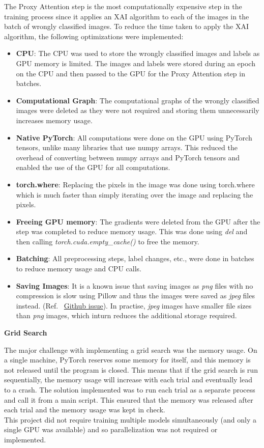 \documentclass[a4paper,11pt,openright]{book}
\begin{document}
The Proxy Attention step is the most computationally expensive step in the training process since it applies an XAI algorithm to each of the images in the batch of wrongly classified images. To reduce the time taken to apply the XAI algorithm, the following optimizations were implemented:
\begin{itemize}
    \item \textbf{CPU}: The CPU was used to store the wrongly classified images and labels as GPU memory is limited. The images and labels were stored during an epoch on the CPU and then passed to the GPU for the Proxy Attention step in batches.
    \item \textbf{Computational Graph}: The computational graphs of the wrongly classified images were deleted as they were not required and storing them unnecessarily increases memory usage.
    \item \textbf{Native PyTorch}: All computations were done on the GPU using PyTorch tensors, unlike many libraries that use numpy arrays. This reduced the overhead of converting between numpy arrays and PyTorch tensors and enabled the use of the GPU for all computations.
    \item \textbf{torch.where}: Replacing the pixels in the image was done using torch.where which is much faster than simply iterating over the image and replacing the pixels.
    \item \textbf{Freeing GPU memory}: The gradients were deleted from the GPU after the step was completed to reduce memory usage. This was done using \textit{del} and then calling \textit{torch.cuda.empty\_cache()} to free the memory.
    \item \textbf{Batching}: All preprocessing steps, label changes, etc., were done in batches to reduce memory usage and CPU calls.
    \item \textbf{Saving Images}: It is a known issue that saving images as \textit{png} files with no compression is slow using Pillow and thus the images were saved as \textit{jpeg} files instead. (Ref. ~\href{https://github.com/python-pillow/Pillow/issues/1211}{Github issue}). In practise, \textit{jpeg} images have smaller file sizes than \textit{png} images, which inturn reduces the additional storage required.

\end{itemize}

\textbf{Grid Search}

The major challenge with implementing a grid search was the memory usage. On a single machine, PyTorch reserves some memory for itself, and this memory is not released until the program is closed. This means that if the grid search is run sequentially, the memory usage will increase with each trial and eventually lead to a crash. The solution implemented was to run each trial as a separate process and call it from a main script. This ensured that the memory was released after each trial and the memory usage was kept in check.\\
This project did not require training multiple models simultaneously (and only a single GPU was available) and so parallelization was not required or implemented.
\end{document}
